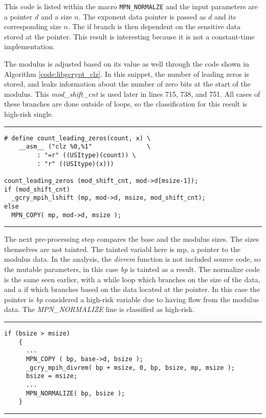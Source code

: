 \documentclass[11pt,a4paper]{article}
\begin{document}
This code is listed within the macro \texttt{MPN\_NORMALZE} and the input
parameters are a pointer $d$ and a size $n$. The exponent data pointer is passed
as $d$ and its corresponding size $n$. The if branch is then dependent on the
sensitive data stored at the pointer. This result is interesting because it is
not a constant-time implementation. 
    

The modulus is adjusted based on its value as well through the code shown in
Algorithm \ref{code:libgcrypt_clz}. In this snippet, the number of leading zeros
is stored, and leaks information about the number of zero bits at the start of
the modulus. This \textit{mod\_shift\_cnt} is used later in lines 715, 738, and
751. All cases of these branches are done outside of loops, so the
classification for this result is high-risk single.

\vspace{5pt}
\hrule
\begin{lstlisting}[caption=Libgcrypt 1.8.2 - mpi-pow.c lines 483-487, label=code:libgcrypt_clz]
# define count_leading_zeros(count, x) \
    __asm__ ("clz %0,%1"               \
	     : "=r" ((USItype)(count)) \
	     : "r" ((USItype)(x)))

count_leading_zeros (mod_shift_cnt, mod->d[msize-1]);
if (mod_shift_cnt)
  _gcry_mpih_lshift (mp, mod->d, msize, mod_shift_cnt);
else
  MPN_COPY( mp, mod->d, msize );
\end{lstlisting}
\hrule
\vspace{5pt}

The next pre-processing step compares the base and the modulus sizes. The sizes
themselves are not tainted. The tainted variabl here is mp, a pointer to the
modulus data. In the analysis, the \textit{divrem} function is not included
source code, so the mutable parameters, in this case \textit{bp} is tainted as a
result. The normalize code is the same seen earlier, with a while loop which
branches on the size of the data, and a if which branches based on the data
located at the pointer. In this case the pointer is \textit{bp} considered a
high-risk variable due to having flow from the modulus data. The
\textit{MPN\_NORMALIZE} line is classified as high-risk.

\vspace{5pt}
\hrule
\begin{lstlisting}[caption=Libgcrypt 1.8.2 - mpi-pow.c lines 491-507]
  if (bsize > msize)
    {
      ... 
      MPN_COPY ( bp, base->d, bsize );
      _gcry_mpih_divrem( bp + msize, 0, bp, bsize, mp, msize );
      bsize = msize;
      ...
      MPN_NORMALIZE( bp, bsize );
    }
\end{lstlisting}
\hrule
\vspace{5pt}
\end{document}

